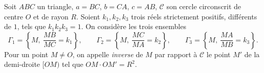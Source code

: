 
Soit $ABC$ un triangle, $a=BC$, $b=CA$, $c=AB$, $\mathcal C$ son cercle circonscrit de centre $O$ et de rayon $R$. Soient $k_1,k_2,k_3$ trois réels strictement positifs, différents de $1$, tels que $k_1k_2k_3=1$. On considère les trois ensembles
\[\Gamma_1=\left\{M,\ \dfrac{MB}{MC}=k_1\right\},\qquad\Gamma_2=\left\{M,\ \dfrac{MC}{MA}=k_2\right\},\qquad\Gamma_3=\left\{M,\ \dfrac{MA}{MB}=k_3\right\}.\]
Pour un point $M\neq O$, on appelle \emph{inverse} de $M$ par rapport à $\mathcal C$ le point $M'$ de la demi-droite $[OM)$ tel que $OM\cdot OM'=R^2$.

